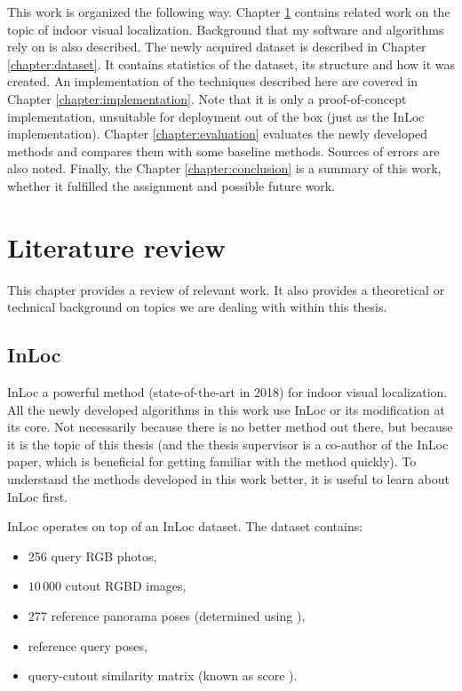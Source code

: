 \documentclass[twoside]{ctuthesis}
\theoremstyle{plain}
\theoremstyle{definition}
\theoremstyle{note}
\newcommand{\code}[1]{{\ttfamily #1%
}}
\begin{document}
This work is organized the following way. Chapter \ref{chapter:literature-review} contains related work on the topic of indoor visual localization. Background that my software and algorithms rely on is also described. The newly acquired dataset is described in Chapter \ref{chapter:dataset}. It contains statistics of the dataset, its structure and how it was created. An implementation of the techniques described here are covered in Chapter \ref{chapter:implementation}. Note that it is only a proof-of-concept implementation, unsuitable for deployment out of the box (just as the InLoc implementation). Chapter \ref{chapter:evaluation} evaluates the newly developed methods and compares them with some baseline methods. Sources of errors are also noted. Finally, the Chapter \ref{chapter:conclusion} is a summary of this work, whether it fulfilled the assignment and possible future work.

\chapter{Literature review}
\label{chapter:literature-review}

This chapter provides a review of relevant work. It also provides a theoretical or technical background on topics we are dealing with within this thesis.

\section{InLoc}
InLoc \cite{taira2018inloc} a powerful method (state-of-the-art in 2018) for indoor visual localization. All the newly developed algorithms in this work use InLoc or its modification at its core. Not necessarily because there is no better method out there, but because it is the topic of this thesis (and the thesis supervisor is a co-author of the InLoc paper, which is beneficial for getting familiar with the method quickly). To understand the methods developed in this work better, it is useful to learn about InLoc first.

InLoc operates on top of an InLoc dataset. The dataset contains:

\begin{itemize}
	\item 256 query RGB photos,
	\item $10\,000$ cutout RGBD images,
	\item 277 reference panorama poses (determined using \cite{wijmans17rgbd}),
	\item reference query poses,
	\item query-cutout similarity matrix (known as \code{score}).
\end{itemize}
\end{document}
